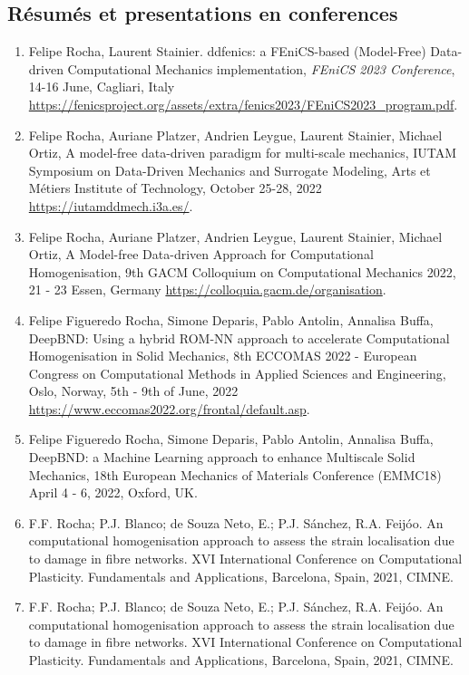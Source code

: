 \documentclass[french]{article}
\begin{document}
\subsection*{Résumés et presentations en conferences} 
\begin{enumerate}
	\item Felipe Rocha, Laurent Stainier. ddfenics: a FEniCS-based (Model-Free)
	Data-driven Computational Mechanics implementation, \textit{FEniCS 2023 Conference}, 14-16 June, Cagliari, Italy \url{https://fenicsproject.org/assets/extra/fenics2023/FEniCS2023_program.pdf}.
	\item Felipe Rocha, Auriane Platzer, Andrien Leygue, Laurent Stainier, Michael Ortiz, A model-free data-driven paradigm for multi-scale mechanics, IUTAM Symposium on Data-Driven Mechanics and Surrogate Modeling, Arts et Métiers Institute of Technology, October 25-28, 2022 \url{https://iutamddmech.i3a.es/}.
	\item Felipe Rocha, Auriane Platzer, Andrien Leygue, Laurent Stainier, Michael Ortiz, A Model-free Data-driven Approach for Computational Homogenisation, 9th GACM Colloquium on Computational Mechanics 2022, 21 - 23 Essen, Germany \url{https://colloquia.gacm.de/organisation}.
	\item Felipe Figueredo Rocha, Simone Deparis, Pablo Antolin, Annalisa Buffa, 
	DeepBND: Using a hybrid ROM-NN approach to accelerate Computational Homogenisation in Solid Mechanics, 8th ECCOMAS 2022 - European Congress on Computational Methods
	in Applied Sciences and Engineering, Oslo, Norway, 5th - 9th of June, 2022 \url{https://www.eccomas2022.org/frontal/default.asp}.
	\item Felipe Figueredo Rocha, Simone Deparis, Pablo Antolin, Annalisa Buffa, 
	DeepBND: a Machine Learning approach to enhance Multiscale Solid Mechanics, 18th European Mechanics of Materials Conference (EMMC18)
	April 4 - 6, 2022, Oxford, UK.
	\item F.F. Rocha; P.J. Blanco; de Souza Neto, E.; P.J. Sánchez, R.A. Feijóo. An computational homogenisation approach to assess the strain localisation due to damage in fibre networks. XVI International Conference on Computational Plasticity. Fundamentals and Applications, Barcelona, Spain, 2021, CIMNE.
	\item F.F. Rocha; P.J. Blanco; de Souza Neto, E.; P.J. Sánchez, R.A. Feijóo. An computational homogenisation approach to assess the strain localisation due to damage in fibre networks. XVI International Conference on Computational Plasticity. Fundamentals and Applications, Barcelona, Spain, 2021, CIMNE.

\end{enumerate}
\end{document}
